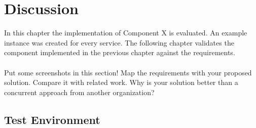 \chapter{Discussion\label{cha:chapter6}}

In this chapter the implementation of Component X is evaluated. An example instance was created for every service. The following chapter validates the component implemented in the previous chapter against the requirements.
\\
\\
Put some screenshots in this section! Map the requirements with your proposed solution. Compare it with related work. Why is your solution better than a concurrent approach from another organization?

\section{Test Environment\label{sec:testenvir}}

